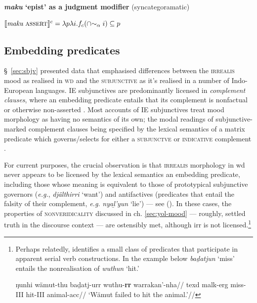 	\pex \textbf{\textit{maku} `\gls{epist}' as a judgment modifier} (syncategoramatic)
	
	$ \denote[c]{\textit{maku}~\textsc{assert}}=\lambda p\lambda i. f_c(\cap{\sim_\alpha i})\subseteq p$

	
	
	
	\xe
		\label{sec:epist}
	
\subsection{Embedding predicates}\label{sec:sbjv2}

\S~\ref{sec:sbjv} presented data that emphasised differences between the \textsc{irrealis} mood as realised in \textsc{wd} and the \textsc{subjunctive} as it's realised in a number of Indo-European languages. IE subjunctives are predominantly licensed in \textit{complement clauses}, where an embedding predicate entails that its complement is nonfactual or otherwise non-asserted \citep[see discussion in][]{Palmer2001}. Most accounts of IE subjunctives treat mood morphology as having no semantics of its own; the modal readings of subjunctive-marked complement clauses being specified by the lexical semantics of a matrix predicate which governs/selects for either a \textsc{subjunctve} or \textsc{indicative} complement \citep[see also][~ch.~2]{Portner2018a}.

For current purposes, the crucial observation is that \textsc{irrealis} morphology in \gls{wd} never appears to be licensed by the lexical semantics an embedding predicate, including those whose meaning is equivalent to those of prototypical subjunctive governors (\textit{e.g.}, \textit{djälthirri} `want') and antifactives (predicates that entail the falsity of their complement, \textit{e.g.} \textit{nyaḻ'yun} `lie') --- see (). In these cases, the properties of \textsc{nonveridicality} discussed in ch. \ref{sec:yol-mood} --- roughly, settled truth in the discourse context --- are ostensibly met, although \gls{irr} is not licensed.\footnote{Perhaps relatedly, \citet{Wilkinson} identifies a small class of predicates that participate in apparent serial verb constructions. In the example below \textit{baḏatjun} `miss' entails the nonrealisation of \textit{wuthun} `hit.'
	
	\ex[exno=i]\begingl\gla ŋunhi wämut-thu baḏatj-urr wuthu-\textbf{rr} warrakan'-nha//
	\glb \gls{texd} \gls{malk}-\gls{erg} miss-\gls{III} hit-\gls{III} animal-\gls{acc}//
	\glft`Wämut failed to hit the animal.'//\endgl\xe
}




